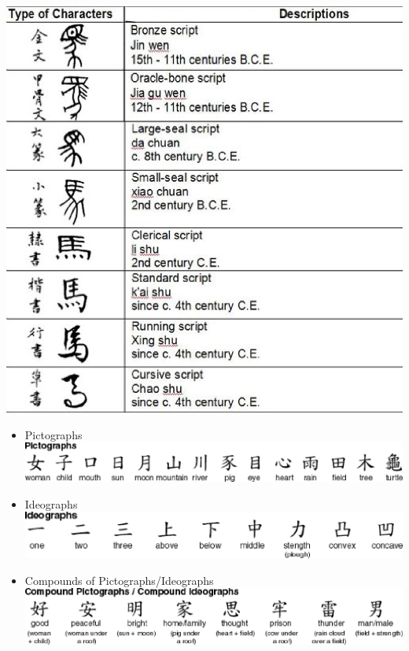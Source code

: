 \documentclass[a4paper,landscape,headrule,footrule,xetex]{foils}
\begin{document}
\includegraphics[height=\textheight]{../pics/horse-hanzi.eps}


\begin{itemize}
\item Pictographs\\
  \includegraphics{../pics/hanzi-1.eps}
\item Ideographs\\
  \includegraphics{../pics/hanzi-2.eps}
\item Compounds of Pictographs/Ideographs\\
  \includegraphics{../pics/hanzi-3.eps}
\end{itemize}
\end{document}
